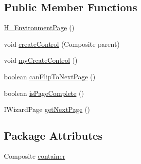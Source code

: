 \subsection*{Public Member Functions}
\begin{DoxyCompactItemize}
\item 
\hyperlink{classit_1_1isislab_1_1masonhelperdocumentation_1_1mason_1_1wizards_1_1_h___environment_page_a3a1a493e45a75cbea547a1fea9405b18}{H\-\_\-\-Environment\-Page} ()
\item 
void \hyperlink{classit_1_1isislab_1_1masonhelperdocumentation_1_1mason_1_1wizards_1_1_h___environment_page_afa254e50558ade144feee2dce02eca78}{create\-Control} (Composite parent)
\item 
void \hyperlink{classit_1_1isislab_1_1masonhelperdocumentation_1_1mason_1_1wizards_1_1_h___environment_page_a09a8404f1e96b68ec8bcb29a3da65558}{my\-Create\-Control} ()
\item 
boolean \hyperlink{classit_1_1isislab_1_1masonhelperdocumentation_1_1mason_1_1wizards_1_1_h___environment_page_a9a0465fa7c25f56063f1c9f51ecbe548}{can\-Flip\-To\-Next\-Page} ()
\item 
boolean \hyperlink{classit_1_1isislab_1_1masonhelperdocumentation_1_1mason_1_1wizards_1_1_h___environment_page_a0e1bebb3a7cdfe163049134a2606de29}{is\-Page\-Complete} ()
\item 
I\-Wizard\-Page \hyperlink{classit_1_1isislab_1_1masonhelperdocumentation_1_1mason_1_1wizards_1_1_h___environment_page_a14e6c806a7a7ac040cc053d2e8a6f263}{get\-Next\-Page} ()
\end{DoxyCompactItemize}
\subsection*{Package Attributes}
\begin{DoxyCompactItemize}
\item 
Composite \hyperlink{classit_1_1isislab_1_1masonhelperdocumentation_1_1mason_1_1wizards_1_1_h___environment_page_ae24bc5d12a792cdda1cba4f0b66f1c4c}{container}
\end{DoxyCompactItemize}
